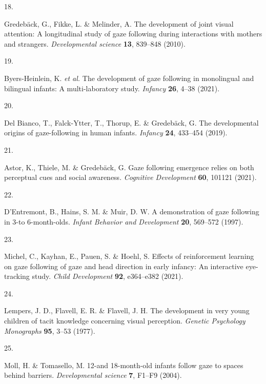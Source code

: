 \documentclass[
  man,floatsintext]{apa6}
\newlength{\cslhangindent}
\newlength{\csllabelwidth}
\newlength{\cslentryspacingunit} %
\newenvironment{CSLReferences}[2] %
 {%
  \setlength{\parindent}{0pt}
  \ifodd #1
  \let\oldpar\par
  \def\par{\hangindent=\cslhangindent\oldpar}
  \fi
  \setlength{\parskip}{#2\cslentryspacingunit}
 }%
 {}
\newcommand{\CSLLeftMargin}[1]{\parbox[t]{\csllabelwidth}{#1}}
\newcommand{\CSLRightInline}[1]{\parbox[t]{\linewidth - \csllabelwidth}{#1}\break}
\begin{document}
\begin{CSLReferences}{0}{0}
\leavevmode{}%
\CSLLeftMargin{18. }%
\CSLRightInline{Gredebäck, G., Fikke, L. \& Melinder, A. The development of joint visual attention: A longitudinal study of gaze following during interactions with mothers and strangers. \emph{Developmental science} \textbf{13}, 839--848 (2010).}

\leavevmode{}%
\CSLLeftMargin{19. }%
\CSLRightInline{Byers-Heinlein, K. \emph{et al.} The development of gaze following in monolingual and bilingual infants: A multi-laboratory study. \emph{Infancy} \textbf{26}, 4--38 (2021).}

\leavevmode{}%
\CSLLeftMargin{20. }%
\CSLRightInline{Del Bianco, T., Falck-Ytter, T., Thorup, E. \& Gredebäck, G. The developmental origins of gaze-following in human infants. \emph{Infancy} \textbf{24}, 433--454 (2019).}

\leavevmode{}%
\CSLLeftMargin{21. }%
\CSLRightInline{Astor, K., Thiele, M. \& Gredebäck, G. Gaze following emergence relies on both perceptual cues and social awareness. \emph{Cognitive Development} \textbf{60}, 101121 (2021).}

\leavevmode{}%
\CSLLeftMargin{22. }%
\CSLRightInline{D'Entremont, B., Hains, S. M. \& Muir, D. W. A demonstration of gaze following in 3-to 6-month-olds. \emph{Infant Behavior and Development} \textbf{20}, 569--572 (1997).}

\leavevmode{}%
\CSLLeftMargin{23. }%
\CSLRightInline{Michel, C., Kayhan, E., Pauen, S. \& Hoehl, S. Effects of reinforcement learning on gaze following of gaze and head direction in early infancy: An interactive eye-tracking study. \emph{Child Development} \textbf{92}, e364--e382 (2021).}

\leavevmode{}%
\CSLLeftMargin{24. }%
\CSLRightInline{Lempers, J. D., Flavell, E. R. \& Flavell, J. H. The development in very young children of tacit knowledge concerning visual perception. \emph{Genetic Psychology Monographs} \textbf{95}, 3--53 (1977).}

\leavevmode{}%
\CSLLeftMargin{25. }%
\CSLRightInline{Moll, H. \& Tomasello, M. 12-and 18-month-old infants follow gaze to spaces behind barriers. \emph{Developmental science} \textbf{7}, F1--F9 (2004).}


\end{CSLReferences}
\end{document}
